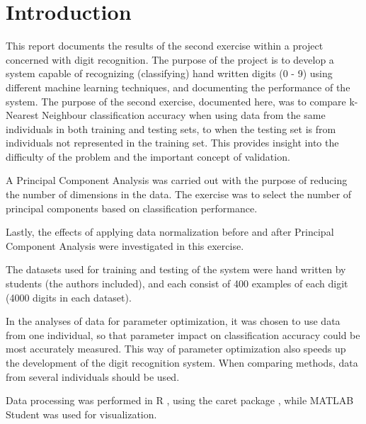 \section{Introduction}
\label{sec:introduction}
This report documents the results of the second exercise within
a project concerned with digit recognition.
The purpose of the project is to develop a system capable of recognizing
(classifying) hand written digits (0 - 9) using different machine learning techniques,
and documenting the performance of the system.
The purpose of the second exercise, documented here, was to
compare k-Nearest Neighbour classification accuracy when using
data from the same individuals in both training and testing sets,
to when the testing set is from individuals not represented in the training set.
This provides insight into the difficulty of the problem and the important
concept of validation.

A Principal Component Analysis was carried out with the purpose
of reducing the number of dimensions in the data.
The exercise was to select the number of principal components
based on classification performance.

Lastly, the effects of applying data normalization before and after
Principal Component Analysis were investigated in this exercise.

The datasets used for training and testing of the system
were hand written by students (the authors included), and each
consist of 400 examples of each digit (4000 digits in each dataset).

In the analyses of data for parameter optimization,
it was chosen to use data from one individual,
so that parameter impact on classification accuracy
could be most accurately measured. This way of parameter
optimization also speeds up the development of the digit recognition system.
When comparing methods, data from several individuals should be used.

Data processing was performed in R \citep{R}, using the caret package \citep{caret},
while MATLAB Student \citep{matlabstudent} was used for visualization.

%
